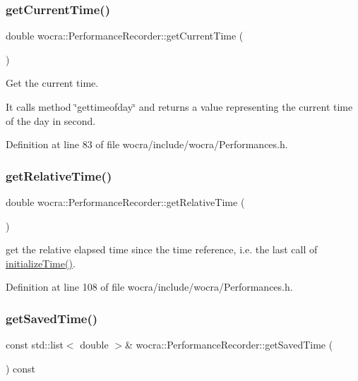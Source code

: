 \subsubsection{\texorpdfstring{get\+Current\+Time()}{getCurrentTime()}}
{\footnotesize\ttfamily double wocra\+::\+Performance\+Recorder\+::get\+Current\+Time (\begin{DoxyParamCaption}{ }\end{DoxyParamCaption})\hspace{0.3cm}{\ttfamily [inline]}}

Get the current time.

It calls method \char`\"{}gettimeofday\char`\"{} and returns a value representing the current time of the day in second. 

Definition at line 83 of file wocra/include/wocra/\+Performances.\+h.

\hypertarget{classwocra_1_1PerformanceRecorder_a170b49e0d8399c21184e706ce915a446}{}\label{classwocra_1_1PerformanceRecorder_a170b49e0d8399c21184e706ce915a446} 
\subsubsection{\texorpdfstring{get\+Relative\+Time()}{getRelativeTime()}}
{\footnotesize\ttfamily double wocra\+::\+Performance\+Recorder\+::get\+Relative\+Time (\begin{DoxyParamCaption}{ }\end{DoxyParamCaption})\hspace{0.3cm}{\ttfamily [inline]}}

get the relative elapsed time since the time reference, i.\+e. the last call of \hyperlink{classwocra_1_1PerformanceRecorder_af1e2e645007a910e8d3af72f1d6aeaeb}{initialize\+Time()}. 

Definition at line 108 of file wocra/include/wocra/\+Performances.\+h.

\hypertarget{classwocra_1_1PerformanceRecorder_a7e27ca829190c70a8a3ce782c409a8ce}{}\label{classwocra_1_1PerformanceRecorder_a7e27ca829190c70a8a3ce782c409a8ce} 
\subsubsection{\texorpdfstring{get\+Saved\+Time()}{getSavedTime()}}
{\footnotesize\ttfamily const std\+::list$<$ double $>$\& wocra\+::\+Performance\+Recorder\+::get\+Saved\+Time (\begin{DoxyParamCaption}{ }\end{DoxyParamCaption}) const\hspace{0.3cm}{\ttfamily [inline]}}

